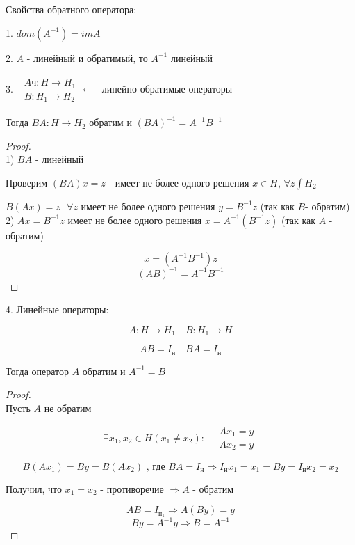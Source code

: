 \documentclass[12pt, a4paper]{report}
\begin{document}
\fi




Свойства обратного оператора: 

1. \( dom (A^{-1 }  ) = im A  \) 

2. \( A \) - линейный и обратимый, то \( A^{-1 }  \) линейный 

3. \( \begin{aligned}
    \begin{aligned}
        Aч: H \to  H_1 \\ 
        B: H_1 \to  H_2 
    \end{aligned}
    \xleftarrow{}  
\end{aligned} \) линейно обратимые операторы 

Тогда \( BA : H \to  H_2  \)  обратим и \( (BA )^{-1 }  = A^{-1 }B^{-1 }   \) 

\begin{proof} \(  \) \\

    1) \( BA  \) - линейный 

    Проверим \( (BA) x = z  \)  - имеет не более одного решения \( x \in  H \), \( \forall  z \int  H_2  \) 

    \( B (A x ) =z  \text{ }  \forall  z \) имеет не более одного решения \( y = B^{-1 }  z  \) (так как \( B \)- обратим)\\

    2) \( Ax = B^{-1 }  z  \)  имеет не более одного решения \( x = A^{-1 }  (B^{-1 }  z ) \) (так как \( A \) - обратим)

    \[  x = (A^{-1 }  B^{-1 }  )z \] 
    \[ (AB ) ^{-1 }  = A^{-1 } B^{-1 } \]
\end{proof}

4. Линейные операторы: 

\[ A : H \to  H_1 \quad  B : H_1 \to  H  \] 

\[ AB  = I_{\text{н} } \quad  BA = I_{\text{н} }   \] 

Тогда оператор \( A \) обратим и \( A^{-1 } =B  \) 

\begin{proof} \(  \) \\

    Пусть \( A  \) не обратим

    \[ \exists  x_1 , x_2 \in H (x_1 \neq x_2 ) : \quad  \begin{aligned}
        A x_1 = y  \\
     A x_2 = y 
    \end{aligned}\] 

    \[ B(A x_1 ) = By = B(A x_2 ) \text{ , где  } BA = I_{\text{н} }   \Rightarrow I_{\text{н} }x_1 = x_1 = B y = I_{\text{н} } x_2 = x_2    \]  

    Получил, что \( x_1 = x_2 \) - противоречие \( \Rightarrow  A\) - обратим

    \[ AB = I_{\text{н}_1 } \Rightarrow A(B y ) = y \] 
    \[ B y = A ^{-1 }  y \Rightarrow B = A^{-1 }  \] 


\end{proof}
\end{document}
